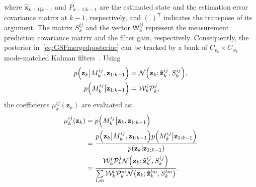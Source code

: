 \documentclass[10pt,twocolumn,twoside]{IEEEtran}
\newcommand{\tran}{^{\mathsf{T}}}
\newcommand{\corcol}[1]{\textcolor{CorCol}{#1}}
\begin{document}
where \(\mathbf{\hat{x}}_{k-1|k-1}\) and \(P_{k-1|k-1}\) are the  estimated state and the estimation error covariance matrix at \(k-1\), respectively, and \(\left(.\right)\tran\) indicates the transpose of its argument. \corcol{The matrix \(S_k^{ij}\) and the vector \(\mathsf{W}_k^{ij}\) represent the measurement prediction covariance matrix and the filter gain, respectively.}
Consequently, the posterior in~\eqref{eq:GSFmergedposterior} can be tracked by a bank of \({C_{v_k}}\times{C_{w_k}}\) mode-matched Kalman filters~\cite{anderson1979optimal,bar2001estimation}. Using
\begin{align}
p{\left(\mathbf{z}_k \big|M_{k}^{ij},\mathbf{z}_{1:k-1}\right)} & = \mathcal{N}{\left(\mathbf{z}_k; \mathbf{\hat{z}}_{k}^{ij}, S_k^{ij}\right)}, \\
p{\left(M_{k}^{ij} \big|\mathbf{z}_{1:k-1}\right)} & = \corcol{\mathcal{W}^i_k\mathcal{P}^j_k},
\end{align}
the coefficients \(\mu_k^{ij}{\left(\mathbf{z}_{k}\right)}\) are evaluated as:
\begin{align}
\mu_k^{ij}{\left(\mathbf{z}_{k}\right)} & = p{\left(M_{k}^{ij} \big|\mathbf{z}_k,\mathbf{z}_{1:k-1}\right)}
\\ & = \frac{p{\left(\mathbf{z}_k \big|M_{k}^{ij},\mathbf{z}_{1:k-1}\right)} p{\left(M_{k}^{ij} \big|\mathbf{z}_{1:k-1}\right)}}{p{\left(\mathbf{z}_{k}|\mathbf{z}_{1:k-1}\right)}}
\\ \label{eq:posteriorCoeff} & = \frac{\corcol{\mathcal{W}^i_k\mathcal{P}^j_k}\mathcal{N}{\left(\mathbf{z}_k ; \mathbf{\hat{z}}_{k}^{ij}, S_k^{ij}\right)}}{\sum \limits _{l,m} \corcol{\mathcal{W}^l_k\mathcal{P}^m_k}\mathcal{N}{\left(\mathbf{z}_k; \mathbf{\hat{z}}_{k}^{lm}, S_k^{lm}\right)}}.
\end{align}
\end{document}
